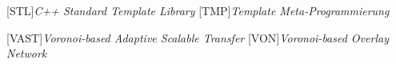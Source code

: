 \begin{acronym}[xxxxxxxxxxxx]
	

	
	[STL]{\emph{C++ Standard Template Library}}
	[TMP]{\emph{Template Meta-Programmierung}}

	[VAST]{\emph{Voronoi-based Adaptive Scalable Transfer}}
	[VON]{\emph{Voronoi-based Overlay Network}}





\end{acronym}
